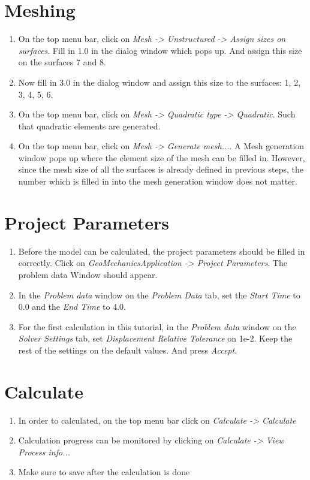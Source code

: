 \section{Meshing}
\begin{enumerate}[resume]
	\item On the top menu bar, click on \textit{Mesh -> Unstructured -> Assign sizes on surfaces}. Fill in 1.0 in the dialog window which pops up. And assign this size on the surfaces 7 and 8.
	
	\item Now fill in 3.0 in the dialog window and assign this size to the surfaces: 1, 2, 3, 4, 5, 6. 
	
	\item On the top menu bar, click on \textit{Mesh -> Quadratic type -> Quadratic}. Such that quadratic elements are generated.
	\item On the top menu bar, click on \textit{Mesh -> Generate mesh...}. A Mesh generation window pops up where the element size of the mesh can be filled in. However, since the mesh size of all the surfaces is already defined in previous steps, the number which is filled in into the mesh generation window does not matter.  
\end{enumerate}


\section{Project Parameters}
\begin{enumerate}[resume]
	\item Before the model can be calculated, the project parameters should be filled in correctly. Click on \textit{GeoMechanicsApplication -> Project Parameters}. The problem data Window should appear.
	
	\item In the \textit{Problem data} window on the \textit{Problem Data} tab, set the \textit{Start Time} to 0.0 and the \textit{End Time} to 4.0.
	
	\item For the first calculation in this tutorial, in the \textit{Problem data} window on the \textit{Solver Settings} tab, set \textit{Displacement Relative Tolerance} on 1e-2. Keep the rest of the settings on the default values. And press \textit{Accept}. 
	
\end{enumerate}

\section{Calculate}
\begin{enumerate}[resume]
	\item In order to calculated, on the top menu bar click on \textit{Calculate -> Calculate}
	
	\item Calculation progress can be monitored by clicking on \textit{Calculate -> View Process info...}	
	
	\item Make sure to save after the calculation is done
\end{enumerate}


